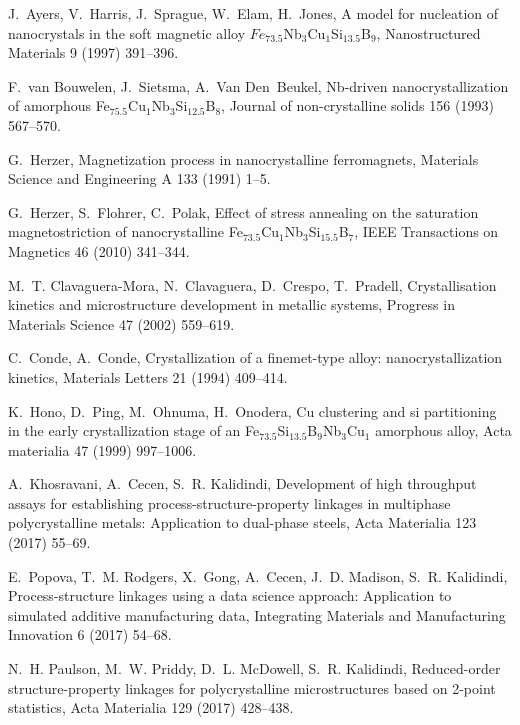 \begin{thebibliography}{10}
J.~Ayers, V.~Harris, J.~Sprague, W.~Elam, H.~Jones, A model for nucleation of
  nanocrystals in the soft magnetic alloy $Fe_{73.5}$Nb$_3$Cu$_1$Si$_{13.5}$B$_9$,
  Nanostructured Materials 9 (1997) 391--396.

F.~van Bouwelen, J.~Sietsma, A.~Van Den~Beukel, Nb-driven nanocrystallization
  of amorphous Fe$_{75.5}$Cu$_{1}$Nb${_3}$Si$_{12.5}$B$_8$, Journal of non-crystalline solids 156
  (1993) 567--570.

G.~Herzer, Magnetization process in nanocrystalline ferromagnets, Materials
  Science and Engineering A 133 (1991) 1--5.

G.~Herzer, S.~Flohrer, C.~Polak, Effect of stress annealing on the saturation
  magnetostriction of nanocrystalline Fe$_{73.5}$Cu$_1$Nb$_3$Si$_{15.5}$B$_7$, IEEE
  Transactions on Magnetics 46 (2010) 341--344.

M.~T. Clavaguera-Mora, N.~Clavaguera, D.~Crespo, T.~Pradell, Crystallisation
  kinetics and microstructure development in metallic systems, Progress in
  Materials Science 47 (2002) 559--619.

C.~Conde, A.~Conde, Crystallization of a finemet-type alloy:
  nanocrystallization kinetics, Materials Letters 21 (1994) 409--414.

K.~Hono, D.~Ping, M.~Ohnuma, H.~Onodera, Cu clustering and si partitioning in
  the early crystallization stage of an Fe$_{73.5}$Si$_{13.5}$B$_9$Nb$_3$Cu$_1$ amorphous
  alloy, Acta materialia 47 (1999) 997--1006.

A.~Khosravani, A.~Cecen, S.~R. Kalidindi,
  {Development
  of high throughput assays for establishing process-structure-property
  linkages in multiphase polycrystalline metals: Application to dual-phase
  steels}, Acta Materialia 123 (2017) 55--69.


E.~Popova, T.~M. Rodgers, X.~Gong, A.~Cecen, J.~D. Madison, S.~R. Kalidindi,
  {Process-structure linkages
  using a data science approach: Application to simulated additive
  manufacturing data}, Integrating Materials and Manufacturing Innovation 6
  (2017) 54--68.


N.~H. Paulson, M.~W. Priddy, D.~L. McDowell, S.~R. Kalidindi,
  {Reduced-order
  structure-property linkages for polycrystalline microstructures based on
  2-point statistics}, Acta Materialia 129 (2017) 428--438.



\end{thebibliography}
